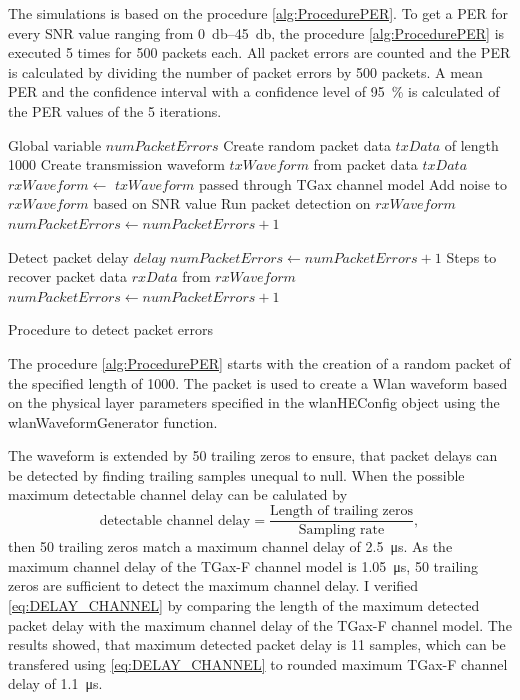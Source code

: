 The simulations is based on the procedure \autoref{alg:ProcedurePER}. To get a \ac{PER} for every \ac{SNR} value ranging
from \SIrange{0}{45}{\decibel}, the procedure \autoref{alg:ProcedurePER} is executed \num{5} times for \num{500} packets each.
All packet errors are counted and the \ac{PER} is calculated by dividing the number of packet errors by \num{500} packets.
A mean \ac{PER} and the confidence interval with a confidence level of
\SI{95}{\percent} is calculated of the \ac{PER} values of the \num{5}  iterations.
\begin{algorithm}
\begin{algorithmic}[1]
\REQUIRE Global variable $numPacketErrors$
\STATE Create random packet data $txData$ of length \SI{1000}{\byte}
\STATE Create transmission waveform $txWaveform$ from packet data $txData$
\STATE $rxWaveform \gets $ $txWaveform$ passed through TGax channel model
\STATE Add noise to $rxWaveform$ based on \ac{SNR} value
\STATE Run packet detection on $rxWaveform$
    \STATE $numPacketErrors \gets numPacketErrors + 1$
\ENDIF

\STATE Detect packet delay $delay$
    \STATE $numPacketErrors \gets numPacketErrors + 1$
\ENDIF
\STATE Steps to recover packet data $rxData$ from $rxWaveform$
    \STATE $numPacketErrors \gets numPacketErrors + 1$
\ENDIF
\end{algorithmic}
\caption{Procedure to detect packet errors}
\label{alg:ProcedurePER}
\end{algorithm}

The procedure \autoref{alg:ProcedurePER} starts with the creation of a random packet of the specified length of \SI{1000}{\byte}.
The packet is used to create a Wlan waveform based on the physical layer parameters specified in the wlanHEConfig object using the wlanWaveformGenerator function.

The waveform is extended by
\num{50} trailing zeros to ensure, that packet delays can be detected by finding trailing samples unequal to null. When the possible maximum detectable channel delay can be calulated by
\begin{equation}\label{eq:DELAY_CHANNEL}
	\text{detectable channel delay} =
	\frac{
		\text{Length of trailing zeros}
	}{
		\text{Sampling rate}
	}
	,
\end{equation}
then \num{50} trailing zeros match a maximum channel delay of \SI{2.5}{\micro\second}. As the maximum channel delay of the TGax-F channel model is \SI{1.05}{\micro\second},
\num{50} trailing zeros are sufficient to detect the maximum channel delay. I verified \autoref{eq:DELAY_CHANNEL} by comparing
the length of the maximum detected packet delay with the maximum channel delay of the TGax-F channel model. The results showed,
that maximum detected packet delay is \num{11} samples, which can be transfered using \autoref{eq:DELAY_CHANNEL} to rounded maximum TGax-F channel delay of \SI{1.1}{\micro\second}.

